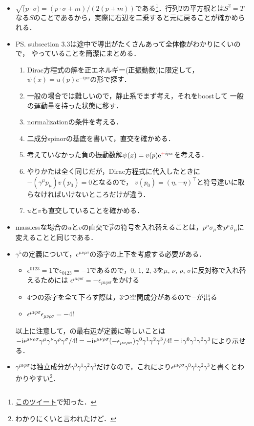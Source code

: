 \begin{itemize}
	\item $\sqrt(p\cdot \sigma) = (p\cdot \sigma + m) / (2(p+m))$である\footnote{\href{https://twitter.com/Eymmetry/status/1651505864510173186?s=20}{このツイート}で知った．}．行列$T$の平方根とは$S^2 = T$なる$S$のことであるから，実際に右辺を二乗すると元に戻ることが確かめられる．
	\item PS. subsection 3.3は途中で導出がたくさんあって全体像がわかりにくいので，
		やっていることを簡潔にまとめる．
		\begin{enumerate}
			\item Dirac方程式の解を正エネルギー(正振動数)に限定して，$\psi(x) = u(p)e^{-ipx}$の形で探す．
			\item 一般の場合では難しいので，静止系でまず考え，それをboostして
				一般の運動量を持った状態に移す．
			\item normalizationの条件を考える．
			\item 二成分spinorの基底を書いて，直交を確かめる．
			\item 考えていなかった負の振動数解$\psi(x) = v(p)\mathrm{e}^{\textcolor{red}{+}ipx}$を考える．
			\item やりかたは全く同じだが，Dirac方程式に代入したときに$-(\gamma^{\mu}p_{\mu})v(p_0) = 0$となるので，
				$v(p_0)=(\eta, -\eta)^{\top}$と符号違いに取らなければいけないところだけが違う．
			\item $u$と$v$も直交していることを確かめる．
		\end{enumerate}
	\item masslessな場合の$u$と$v$の直交で$\vec{p}$の符号を入れ替えることは，$p^{\mu}\sigma_{\mu}$を$p^{\mu}\bar{\sigma}_{\mu}$に変えることと同じである．
	\item $\gamma^5$の定義について，$\epsilon^{\mu\nu\rho\sigma}$の添字の上下を考慮する必要がある．
		\begin{itemize}
			\item $\epsilon^{0123} = 1$で$\epsilon_{0123} = -1$であるので，$0$, $1$, $2$, $3$を$\mu$, $\nu$, $\rho$, $\sigma$に反対称で入れ替えるためには
			$\epsilon^{\mu\nu\rho\sigma} = -\epsilon_{\mu\nu\rho\sigma}$をかける		
		\item $4$つの添字を全て下ろす際は，$3$つ空間成分があるので$-$が出る		\item $\epsilon^{\mu\nu\rho\sigma}\epsilon_{\mu\nu\rho\sigma} = -4!$

		\end{itemize}
		以上に注意して，の最右辺が定義に等しいことは
		$-\mathrm{i}\epsilon^{\mu\nu\rho\sigma}\gamma^{\mu}\gamma^{\nu}\gamma^{\rho}\gamma^{\sigma}/4! = -\mathrm{i}\epsilon^{\mu\nu\rho\sigma}(-\epsilon_{\mu\nu\rho\sigma})\gamma^{0}\gamma^{1}\gamma^{2}\gamma^{3}/4! = \mathrm{i}\gamma^{0}\gamma^{1}\gamma^{2}\gamma^{3}$により示せる．
	\item $\gamma^{\mu\nu\rho\sigma}$は独立成分が$\gamma^{0}\gamma^{1}\gamma^{2}\gamma^{3}$だけなので，これにより$\epsilon^{\mu\nu\rho\sigma}\gamma^{0}\gamma^{1}\gamma^{2}\gamma^{3}$と書くとわかりやすい\footnote{わかりにくいと言われたけど．}．


\end{itemize}
